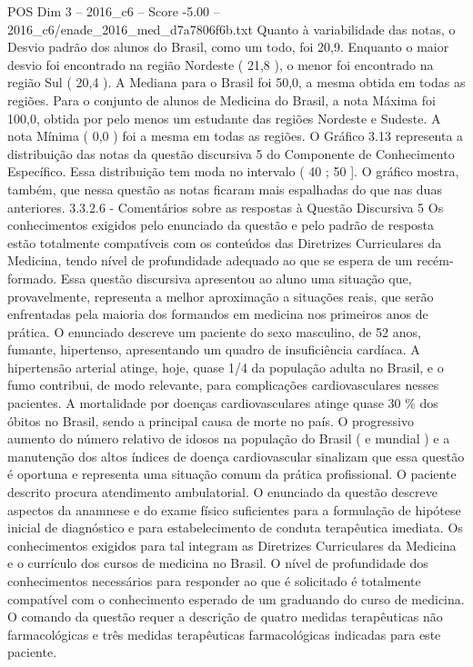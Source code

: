 \begin{textsample}{POS Dim 3 – 2016\_c6 – Score -5.00 – 2016\_c6/enade\_2016\_med\_d7a7806f6b.txt}
Quanto à variabilidade das notas, o Desvio padrão dos alunos do Brasil, como um todo, foi 20,9.
Enquanto o maior desvio foi encontrado na região Nordeste ( 21,8 ), o menor foi encontrado na região Sul ( 20,4 ).
A Mediana para o Brasil foi 50,0, a mesma obtida em todas as regiões.
Para o conjunto de alunos de Medicina do Brasil, a nota Máxima foi 100,0, obtida por pelo menos um estudante das regiões Nordeste e Sudeste.
A nota Mínima ( 0,0 ) foi a mesma em todas as regiões.
O Gráfico 3.13 representa a distribuição das notas da questão discursiva 5 do Componente de Conhecimento Específico.
Essa distribuição tem moda no intervalo ( 40 ; 50 ].
O gráfico mostra, também, que nessa questão as notas ficaram mais espalhadas do que nas duas anteriores. 3.3.2.6 - Comentários sobre as respostas à Questão Discursiva 5 Os conhecimentos exigidos pelo enunciado da questão e pelo padrão de resposta estão totalmente compatíveis com os conteúdos das Diretrizes Curriculares da Medicina, tendo nível de profundidade adequado ao que se espera de um recém-formado.
Essa questão discursiva apresentou ao aluno uma situação que, provavelmente, representa a melhor aproximação a situações reais, que serão enfrentadas pela maioria dos formandos em medicina nos primeiros anos de prática.
O enunciado descreve um paciente do sexo masculino, de 52 anos, fumante, hipertenso, apresentando um quadro de insuficiência cardíaca.
A hipertensão arterial atinge, hoje, quase 1/4 da população adulta no Brasil, e o fumo contribui, de modo relevante, para complicações cardiovasculares nesses pacientes.
A mortalidade por doenças cardiovasculares atinge quase 30 \% dos óbitos no Brasil, sendo a principal causa de morte no país.
O progressivo aumento do número relativo de idosos na população do Brasil ( e mundial ) e a manutenção dos altos índices de doença cardiovascular sinalizam que essa questão é oportuna e representa uma situação comum da prática profissional.
O paciente descrito procura atendimento ambulatorial.
O enunciado da questão descreve aspectos da anamnese e do exame físico suficientes para a formulação de hipótese inicial de diagnóstico e para estabelecimento de conduta terapêutica imediata.
Os conhecimentos exigidos para tal integram as Diretrizes Curriculares da Medicina e o currículo dos cursos de medicina no Brasil.
O nível de profundidade dos conhecimentos necessários para responder ao que é solicitado é totalmente compatível com o conhecimento esperado de um graduando do curso de medicina.
O comando da questão requer a descrição de quatro medidas terapêuticas não farmacológicas e três medidas terapêuticas farmacológicas indicadas para este paciente.

\end{textsample}
